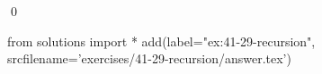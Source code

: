 
\begin{ex}
  \label{ex:41-29-recursion}
  
  \qed
\end{ex}
\begin{python0}
from solutions import *
add(label="ex:41-29-recursion",
    srcfilename='exercises/41-29-recursion/answer.tex')
\end{python0}

